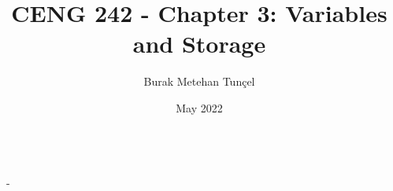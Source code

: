 \documentclass{article}
\title{CENG 242 - Chapter 3: Variables and Storage}
\author{Burak Metehan Tunçel}
\date{May 2022}
\makeatletter
\renewcommand\maketitle{
{\raggedright %
\begin{center}
{\Large \bfseries \@title}\\[2ex] 
{\large \@author \ - \@date}\\[2ex]
\end{center}}} %
\makeatother
\begin{document}
\maketitle

\begin{multicols*}{2}
\setlength{\columnsep}{1.5cm}
\setlength{\columnseprule}{0.2pt}











\newpage






\end{multicols*}
\end{document}
